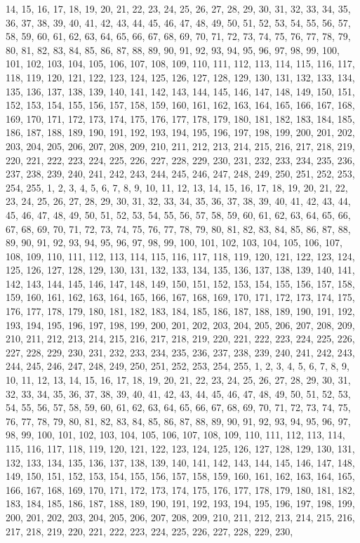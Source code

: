 14, 15, 16, 17, 18, 19, 20, 21, 22, 23, 24, 25, 26, 27, 28, 29, 30, 31, 32, 33, 34, 35, 36, 37, 38, 39, 40, 41, 42, 43, 44, 45, 46, 47, 48, 49, 50, 51, 52, 53, 54, 55, 56, 57, 58, 59, 60, 61, 62, 63, 64, 65, 66, 67, 68, 69, 70, 71, 72, 73, 74, 75, 76, 77, 78, 79, 80, 81, 82, 83, 84, 85, 86, 87, 88, 89, 90, 91, 92, 93, 94, 95, 96, 97, 98, 99, 100, 101, 102, 103, 104, 105, 106, 107, 108, 109, 110, 111, 112, 113, 114, 115, 116, 117, 118, 119, 120, 121, 122, 123, 124, 125, 126, 127, 128, 129, 130, 131, 132, 133, 134, 135, 136, 137, 138, 139, 140, 141, 142, 143, 144, 145, 146, 147, 148, 149, 150, 151, 152, 153, 154, 155, 156, 157, 158, 159, 160, 161, 162, 163, 164, 165, 166, 167, 168, 169, 170, 171, 172, 173, 174, 175, 176, 177, 178, 179, 180, 181, 182, 183, 184, 185, 186, 187, 188, 189, 190, 191, 192, 193, 194, 195, 196, 197, 198, 199, 200, 201, 202, 203, 204, 205, 206, 207, 208, 209, 210, 211, 212, 213, 214, 215, 216, 217, 218, 219, 220, 221, 222, 223, 224, 225, 226, 227, 228, 229, 230, 231, 232, 233, 234, 235, 236, 237, 238, 239, 240, 241, 242, 243, 244, 245, 246, 247, 248, 249, 250, 251, 252, 253, 254, 255, 1, 2, 3, 4, 5, 6, 7, 8, 9, 10, 11, 12, 13, 14, 15, 16, 17, 18, 19, 20, 21, 22, 23, 24, 25, 26, 27, 28, 29, 30, 31, 32, 33, 34, 35, 36, 37, 38, 39, 40, 41, 42, 43, 44, 45, 46, 47, 48, 49, 50, 51, 52, 53, 54, 55, 56, 57, 58, 59, 60, 61, 62, 63, 64, 65, 66, 67, 68, 69, 70, 71, 72, 73, 74, 75, 76, 77, 78, 79, 80, 81, 82, 83, 84, 85, 86, 87, 88, 89, 90, 91, 92, 93, 94, 95, 96, 97, 98, 99, 100, 101, 102, 103, 104, 105, 106, 107, 108, 109, 110, 111, 112, 113, 114, 115, 116, 117, 118, 119, 120, 121, 122, 123, 124, 125, 126, 127, 128, 129, 130, 131, 132, 133, 134, 135, 136, 137, 138, 139, 140, 141, 142, 143, 144, 145, 146, 147, 148, 149, 150, 151, 152, 153, 154, 155, 156, 157, 158, 159, 160, 161, 162, 163, 164, 165, 166, 167, 168, 169, 170, 171, 172, 173, 174, 175, 176, 177, 178, 179, 180, 181, 182, 183, 184, 185, 186, 187, 188, 189, 190, 191, 192, 193, 194, 195, 196, 197, 198, 199, 200, 201, 202, 203, 204, 205, 206, 207, 208, 209, 210, 211, 212, 213, 214, 215, 216, 217, 218, 219, 220, 221, 222, 223, 224, 225, 226, 227, 228, 229, 230, 231, 232, 233, 234, 235, 236, 237, 238, 239, 240, 241, 242, 243, 244, 245, 246, 247, 248, 249, 250, 251, 252, 253, 254, 255, 1, 2, 3, 4, 5, 6, 7, 8, 9, 10, 11, 12, 13, 14, 15, 16, 17, 18, 19, 20, 21, 22, 23, 24, 25, 26, 27, 28, 29, 30, 31, 32, 33, 34, 35, 36, 37, 38, 39, 40, 41, 42, 43, 44, 45, 46, 47, 48, 49, 50, 51, 52, 53, 54, 55, 56, 57, 58, 59, 60, 61, 62, 63, 64, 65, 66, 67, 68, 69, 70, 71, 72, 73, 74, 75, 76, 77, 78, 79, 80, 81, 82, 83, 84, 85, 86, 87, 88, 89, 90, 91, 92, 93, 94, 95, 96, 97, 98, 99, 100, 101, 102, 103, 104, 105, 106, 107, 108, 109, 110, 111, 112, 113, 114, 115, 116, 117, 118, 119, 120, 121, 122, 123, 124, 125, 126, 127, 128, 129, 130, 131, 132, 133, 134, 135, 136, 137, 138, 139, 140, 141, 142, 143, 144, 145, 146, 147, 148, 149, 150, 151, 152, 153, 154, 155, 156, 157, 158, 159, 160, 161, 162, 163, 164, 165, 166, 167, 168, 169, 170, 171, 172, 173, 174, 175, 176, 177, 178, 179, 180, 181, 182, 183, 184, 185, 186, 187, 188, 189, 190, 191, 192, 193, 194, 195, 196, 197, 198, 199, 200, 201, 202, 203, 204, 205, 206, 207, 208, 209, 210, 211, 212, 213, 214, 215, 216, 217, 218, 219, 220, 221, 222, 223, 224, 225, 226, 227, 228, 229, 230, 